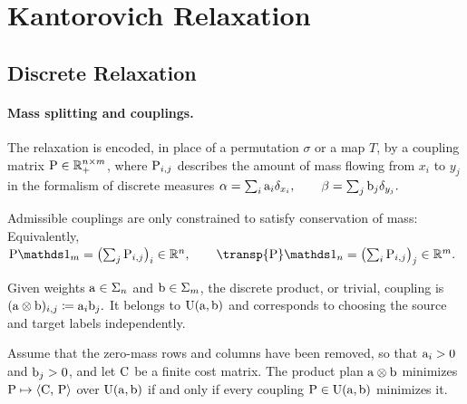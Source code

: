 \section{Kantorovich Relaxation}
\label{sec-kantorovich}
\subsection{Discrete Relaxation}
\label{sec-discrete-relaxation}
\paragraph{Mass splitting and couplings.}
The relaxation is encoded, in place of a permutation $\sigma$ or a map $T$, by a coupling matrix $\P\in\RR_+^{n\times m}$, where $\P_{i,j}$ describes the amount of mass flowing from $x_i$ to $y_j$ in the formalism of discrete measures
\(\al=\sum_i \a_i\de_{x_i}, \qquad \be=\sum_j \b_j\de_{y_j}.\)
\begin{defn}\label{def-discrete-couplings}
Admissible couplings are only constrained to satisfy conservation of mass:
Equivalently, \(\P\ones_m=\bigl(\sum_j \P_{i,j}\bigr)_i\in\RR^n, \qquad \transp{\P}\ones_n=\bigl(\sum_i \P_{i,j}\bigr)_j\in\RR^m.\)
\end{defn}
\begin{defn}\label{def-discrete-product-coupling}
Given weights $\a\in\simplex_n$ and $\b\in\simplex_m$, the discrete product, or trivial, coupling is \((\a\otimes\b)_{i,j}\eqdef \a_i\b_j.\)
It belongs to $\CouplingsD(\a,\b)$ and corresponds to choosing the source and target labels independently.
\end{defn}
\begin{prop}\label{prop-discrete-product-coupling-degenerate}
Assume that the zero-mass rows and columns have been removed, so that $\a_i>0$ and $\b_j>0$, and let $\C$ be a finite cost matrix. The product plan $\a\otimes\b$ minimizes $\P\mapsto\dotp{\C}{\P}$ over $\CouplingsD(\a,\b)$ if and only if every coupling $\P\in\CouplingsD(\a,\b)$ minimizes it.
\end{prop}
